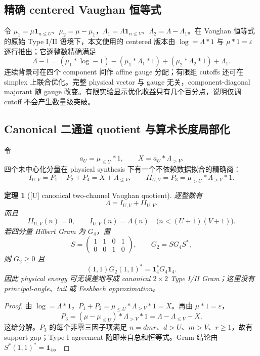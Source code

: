 \documentclass[UTF8,11pt,a4paper]{ctexart}
\newtheorem{theorem}{定理}[section]
\theoremstyle{definition}
\theoremstyle{remark}
\newcommand{\1}{\mathbf 1}
\newcommand{\statusU}{\textnormal{[U]}}
\begin{document}
\subsection{精确 centered Vaughan 恒等式}

令 $\mu_1=\mu\1_{n\leq U}$、$\mu_2=\mu-\mu_1$，$\Lambda_1=\Lambda\1_{n\leq V}$、$\Lambda_2=\Lambda-\Lambda_1$。在 Vaughan 恒等式的原始 Type I/II 语境\cite{Vaughan}下，本文使用的 centered 版本由 $\log=\Lambda*1$ 与 $\mu*1=\varepsilon$ 逐行推出；它逐整数精确满足
\[
\boxed{
\Lambda-1=(\mu_1*\log-1)-(\mu_1*\Lambda_1*1)
 +(\mu_2*\Lambda_2*1)+\Lambda_1.}
\]
连续背景可在四个 component 间作 affine gauge 分配；有限组 cutoffs 还可在 simplex 上联合优化。完整 physical vector 与 gauge 无关，component-diagonal majorant 随 gauge 改变。有限实验显示优化收益只有几个百分点，说明仅调 cutoff 不会产生数量级突破。

\subsection{Canonical 二通道 quotient 与算术长度局部化}

令
\[
 a_U=\mu_{\leq U}*1,\qquad X=a_U*\Lambda_{>V}.
\]
四个未中心化分量在 physical synthesis 下有一个不依赖数据拟合的精确商：
\[
 I_{U,V}=P_1+P_2+P_4=X+\Lambda_{\leq V},\qquad
 II_{U,V}=P_3=\mu_{>U}*\Lambda_{>V}*1.
\]

\begin{theorem}[\statusU{} canonical two-channel Vaughan quotient]\label{thm:two-vaughan}
逐整数有
\[
 \Lambda=I_{U,V}+II_{U,V}.
\]
而且
\[
 II_{U,V}(n)=0,\qquad
 I_{U,V}(n)=\Lambda(n)
 \quad\bigl(n<(U+1)(V+1)\bigr).
\]
若四分量 Hilbert Gram 为 $G_4$，置
\[
 S=\begin{pmatrix}1&1&0&1\\0&0&1&0\end{pmatrix},
 \qquad G_2=SG_4S^*,
\]
则 $G_2\geq0$ 且
\[
 (1,1)G_2(1,1)^*=\1_4^*G_4\1_4.
\]
因此 physical energy 可无误差地写成 canonical $2\times2$ Type I/II Gram；这里没有 principal-angle、tail 或 Feshbach approximation。
\end{theorem}

\begin{proof}
由 $\log=\Lambda*1$，$P_1+P_2=\mu_{\leq U}*\Lambda_{>V}*1=X$。再由 $\mu*1=\varepsilon$，
\[
 P_3=(\mu-\mu_{\leq U})*\Lambda_{>V}*1
    =\Lambda-\Lambda_{\leq V}-X.
\]
这给分解。$P_3$ 的每个非零三因子项满足 $n=dmr$、$d>U$、$m>V$、$r\geq1$，故有 support gap；Type I agreement 随即来自总和恒等式。Gram 结论由 $S^*(1,1)^*=\1_4$。
\end{proof}
\end{document}
